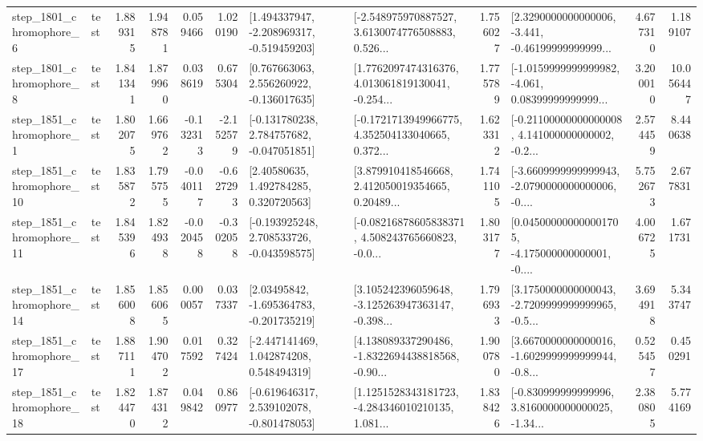 \begin{tabular}{llrrrrllrlrr}
  step\_1801\_chromophore\_6 &      test &      1.889315 &    1.948781 &      0.059466 &  1.020190 &   [1.494337947, -2.208969317, -0.519459203] &  [-2.548975970887527, 3.6130074776508883, 0.526... &       1.756027 &  [2.3290000000000006, -3.441, -0.46199999999999... &            4.677310 &          1.189107 \\
  step\_1801\_chromophore\_8 &      test &      1.841341 &    1.879960 &      0.038619 &  0.675304 &    [0.767663063, 2.556260922, -0.136017635] &  [1.7762097474316376, 4.013061819130041, -0.254... &       1.775789 &  [-1.0159999999999982, -4.061, 0.08399999999999... &            3.200010 &         10.056447 \\
  step\_1851\_chromophore\_1 &      test &      1.802075 &    1.669762 &     -0.132313 & -2.152579 &   [-0.131780238, 2.784757682, -0.047051851] &  [-0.1721713949966775, 4.352504133040665, 0.372... &       1.623312 &  [-0.21100000000000008, 4.141000000000002, -0.2... &            2.574459 &          8.440638 \\
 step\_1851\_chromophore\_10 &      test &      1.835872 &    1.795755 &     -0.040117 & -0.627293 &      [2.40580635, 1.492784285, 0.320720563] &  [3.879910418546668, 2.412050019354665, 0.20489... &       1.741105 &  [-3.6609999999999943, -2.0790000000000006, -0.... &            5.752673 &          2.677831 \\
 step\_1851\_chromophore\_11 &      test &      1.845396 &    1.824938 &     -0.020458 & -0.302058 &   [-0.193925248, 2.708533726, -0.043598575] &  [-0.08216878605838371, 4.508243765660823, -0.0... &       1.803177 &  [0.045000000000001705, -4.175000000000001, -0.... &            4.006725 &          1.671731 \\
 step\_1851\_chromophore\_14 &      test &      1.856008 &    1.856065 &      0.000057 &  0.037337 &    [2.03495842, -1.695364783, -0.201735219] &  [3.105242396059648, -3.125263947363147, -0.398... &       1.796933 &  [3.1750000000000043, -2.7209999999999965, -0.5... &            3.694918 &          5.343747 \\
 step\_1851\_chromophore\_17 &      test &      1.887111 &    1.904702 &      0.017592 &  0.327424 &    [-2.447141469, 1.042874208, 0.548494319] &  [4.138089337290486, -1.8322694438818568, -0.90... &       1.900780 &  [3.6670000000000016, -1.6029999999999944, -0.8... &            0.525457 &          0.450291 \\
 step\_1851\_chromophore\_18 &      test &      1.824470 &    1.874312 &      0.049842 &  0.860977 &   [-0.619646317, 2.539102078, -0.801478053] &  [1.1251528343181723, -4.284346010210135, 1.081... &       1.838426 &  [-0.830999999999996, 3.8160000000000025, -1.34... &            2.380805 &          5.774169 \\

\end{tabular}
